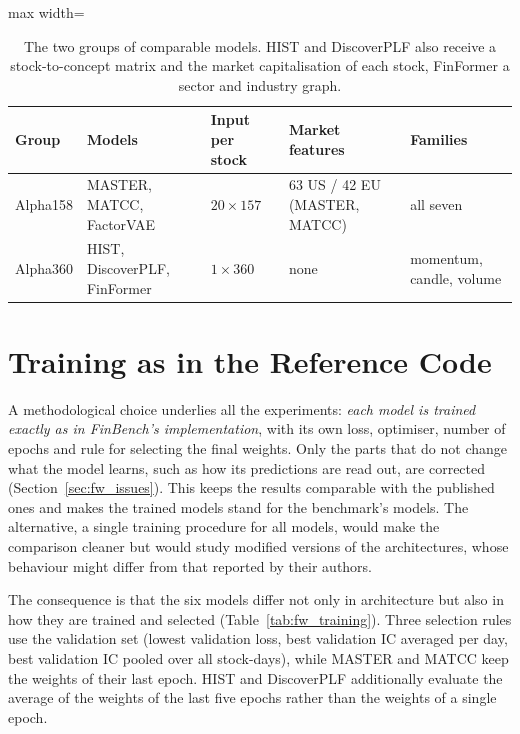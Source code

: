 \begin{table}[htbp]
    \centering
    \small
    \begin{adjustbox}{max width=\textwidth}
    \begin{tabular}{@{}llllp{4.2cm}@{}}
        \toprule
        \textbf{Group} & \textbf{Models} & \textbf{Input per stock} & \textbf{Market features} & \textbf{Families} \\
        \midrule
        Alpha158 & MASTER, MATCC, FactorVAE & $20 \times 157$ & 63 US / 42 EU (MASTER, MATCC) & all seven \\
        Alpha360 & HIST, DiscoverPLF, FinFormer & $1 \times 360$ & none & momentum, candle, volume \\
        \bottomrule
    \end{tabular}
    \end{adjustbox}
    \caption{The two groups of comparable models. HIST and DiscoverPLF also receive a stock-to-concept matrix and the market capitalisation of each stock, FinFormer a sector and industry graph.}
    \label{tab:fw_groups}
\end{table}

\section{Training as in the Reference Code}
\label{sec:fw_training}

A methodological choice underlies all the experiments: \emph{each model is trained exactly as in FinBench's implementation}, with its own loss, optimiser, number of epochs and rule for selecting the final weights. Only the parts that do not change what the model learns, such as how its predictions are read out, are corrected (Section~\ref{sec:fw_issues}). This keeps the results comparable with the published ones and makes the trained models stand for the benchmark's models. The alternative, a single training procedure for all models, would make the comparison cleaner but would study modified versions of the architectures, whose behaviour might differ from that reported by their authors.

The consequence is that the six models differ not only in architecture but also in how they are trained and selected (Table~\ref{tab:fw_training}). Three selection rules use the validation set (lowest validation loss, best validation IC averaged per day, best validation IC pooled over all stock-days), while MASTER and MATCC keep the weights of their last epoch. HIST and DiscoverPLF additionally evaluate the average of the weights of the last five epochs rather than the weights of a single epoch.


